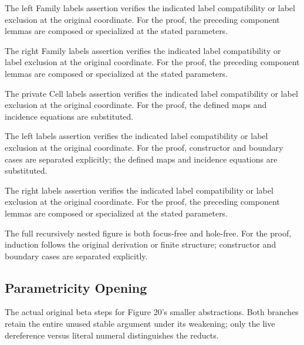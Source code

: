 The left Family labels assertion verifies the indicated label compatibility or label exclusion at the original coordinate.
For the proof, the preceding component lemmas are composed or specialized at the stated parameters.
\par{}

The right Family labels assertion verifies the indicated label compatibility or label exclusion at the original coordinate.
For the proof, the preceding component lemmas are composed or specialized at the stated parameters.
\par{}

The private Cell labels assertion verifies the indicated label compatibility or label exclusion at the original coordinate.
For the proof, the defined maps and incidence equations are substituted.
\par{}

The left labels assertion verifies the indicated label compatibility or label exclusion at the original coordinate.
For the proof, constructor and boundary cases are separated explicitly; the defined maps and incidence equations are substituted.
\par{}

The right labels assertion verifies the indicated label compatibility or label exclusion at the original coordinate.
For the proof, the preceding component lemmas are composed or specialized at the stated parameters.
\par{}

The full recursively nested figure is both focus-free and hole-free.
For the proof, induction follows the original derivation or finite structure; constructor and boundary cases are separated explicitly.
\par{}

\subsection{Parametricity Opening}
The actual original beta steps for Figure 20's smaller abstractions. Both branches retain the entire unused stable argument under its weakening; only the live dereference versus literal numeral distinguishes the reducts.

